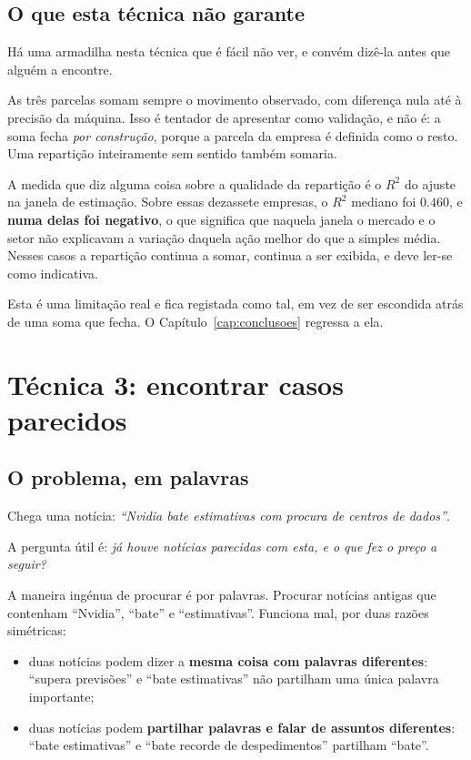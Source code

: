 \subsection{O que esta técnica não garante}

Há uma armadilha nesta técnica que é fácil não ver, e convém dizê-la antes que alguém a encontre.

As três parcelas somam sempre o movimento observado, com diferença nula até à precisão da máquina.
Isso é tentador de apresentar como validação, e não é: a soma fecha \emph{por construção}, porque a
parcela da empresa é definida como o resto. Uma repartição inteiramente sem sentido também somaria.

A medida que diz alguma coisa sobre a qualidade da repartição é o $R^2$ do ajuste na janela de
estimação. Sobre essas dezassete empresas, o $R^2$ mediano foi $0.460$, e \textbf{numa delas foi negativo}, o
que significa que naquela janela o mercado e o setor não explicavam a variação daquela ação melhor
do que a simples média. Nesses casos a repartição continua a somar, continua a ser exibida, e deve
ler-se como indicativa.

Esta é uma limitação real e fica registada como tal, em vez de ser escondida atrás de uma soma que
fecha. O Capítulo~\ref{cap:conclusoes} regressa a ela.

\section{Técnica 3: encontrar casos parecidos}
\label{sec:met_recuperacao}

\subsection{O problema, em palavras}

Chega uma notícia: \emph{``Nvidia bate estimativas com procura de centros de dados''}.

A pergunta útil é: \emph{já houve notícias parecidas com esta, e o que fez o preço a seguir?}

A maneira ingénua de procurar é por palavras. Procurar notícias antigas que contenham ``Nvidia'',
``bate'' e ``estimativas''. Funciona mal, por duas razões simétricas:

\begin{itemize}
  \item duas notícias podem dizer a \textbf{mesma coisa com palavras diferentes}:
        ``supera previsões'' e ``bate estimativas'' não partilham uma única palavra importante;
  \item duas notícias podem \textbf{partilhar palavras e falar de assuntos diferentes}: ``bate
        estimativas'' e ``bate recorde de despedimentos'' partilham ``bate''.
\end{itemize}

